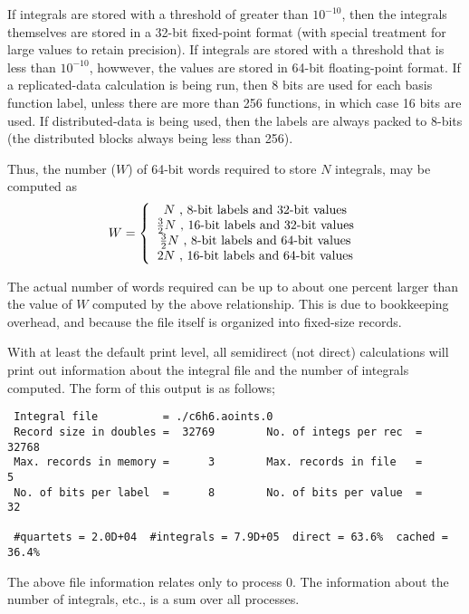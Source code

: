 If integrals are stored with a threshold of greater than $10^{-10}$,
then the integrals themselves are stored in a 32-bit fixed-point
format (with special treatment for large values to retain precision).
If integrals are stored with a threshold that is less than $10^{-10}$,
howwever, the values are stored in 64-bit floating-point format.  If a
replicated-data calculation is being run, then 8 bits are used for
each basis function label, unless there are more than 256 functions,
in which case 16 bits are used.  If distributed-data is being used,
then the labels are always packed to 8-bits (the distributed blocks
always being less than 256).

Thus, the number ($W$) of 64-bit words required to store $N$
integrals, may be computed as
\begin{displaymath}
  W = \left\{ \\
      \begin{array}{c}
        N \mbox{ , 8-bit labels and 32-bit values} \\
        \frac{3}{2}N \mbox{ , 16-bit labels and 32-bit values} \\
        \frac{3}{2}N \mbox{ , 8-bit labels and 64-bit values} \\
        2N \mbox{ , 16-bit labels and 64-bit values} 
      \end{array}
      \right.
\end{displaymath}

The actual number of words required can be up to about one percent
larger than the value of $W$ computed by the above relationship.  This
is due to bookkeeping overhead, and because the file itself is
organized into fixed-size records.

With at least the default print level, all semidirect (not direct)
calculations will print out information about the integral file and
the number of integrals computed.  The form of this output is as
follows;

\begin{verbatim}
 Integral file          = ./c6h6.aoints.0
 Record size in doubles =  32769        No. of integs per rec  =  32768
 Max. records in memory =      3        Max. records in file   =      5
 No. of bits per label  =      8        No. of bits per value  =     32

 #quartets = 2.0D+04  #integrals = 7.9D+05  direct = 63.6%  cached = 36.4%
\end{verbatim}

The above file information relates only to process 0.  The information
about the number of integrals, etc., is a sum over all processes.

